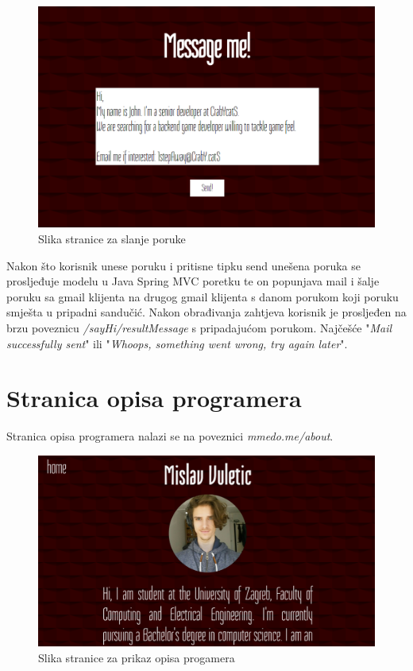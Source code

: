 \documentclass[times, utf8, zavrsni, numeric]{fer}
\begin{document}
\begin{figure}[htb]
				\centering
				\includegraphics[width=14.6cm]{images/message.png}
				\caption{Slika stranice za slanje poruke}
				\label{fig:message}
\end{figure}

Nakon što korisnik unese poruku i pritisne tipku send unešena poruka se prosljeđuje modelu u Java Spring MVC poretku te on popunjava mail i šalje poruku sa gmail klijenta na drugog gmail klijenta s danom porukom koji poruku smješta u pripadni sandučić.
Nakon obrađivanja zahtjeva korisnik je prosljeđen na brzu poveznicu \textit{/sayHi/resultMessage} s pripadajućom porukom.
Najčešće "\textit{Mail successfully sent}" ili "\textit{Whoops, something went wrong, try again later}".

\section{Stranica opisa programera}
\qquad Stranica opisa programera nalazi se na poveznici \textit{mmedo.me/about}.

\begin{figure}[htb]
				\centering
				\includegraphics[width=14.6cm]{images/about.png}
				\caption{Slika stranice za prikaz opisa progamera}
				\label{fig:about}
\end{figure}
\end{document}

